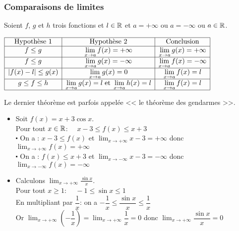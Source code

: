  \subsubsection*{Comparaisons de limites}
\begin{theorem}
Soient $f $, $g$ et $h$ trois fonctions et $ l\in\mathbb{R}$ et  $ a= +\infty $ ou $ a=-\infty $ ou $ a\in\mathbb{R} $.



$\begin{array}{|c|c|c|}
\hline
\text{Hypothèse 1}  & \text{Hypothèse 2} & \text{Conclusion}\\
\hline
 f\leq g   &  \displaystyle \lim_{x \to a}f(x)=+\infty  & \displaystyle \lim_{x \to a}g(x)=+\infty  \\
 \hline
  f\leq g   & \displaystyle \lim_{x \to a}g(x)=-\infty  &  \displaystyle \lim_{x \to a}f(x)=-\infty     \\
\hline
 \left\lvert f(x)-l  \right\rvert\leq g(x)  & \displaystyle \lim_{x \to a}g(x)=0 &  \displaystyle \lim_{x \to a}f(x)=l   \\
\hline
 g \leq f \leq h  &  \displaystyle \lim_{x \to a}g(x)=l \;\text{et} \; \displaystyle \lim_{x \to a}h(x)=l  &  \displaystyle \lim_{x \to a}f(x)=l     \\
\hline
\end{array}$
\end{theorem}

\begin{remark}
Le dernier théorème est parfois appelée << le théorème des gendarmes >>.
 \end{remark}

\begin{example}
\begin{itemize}
\item  Soit $ f(x)= x+ 3\cos x $.\\
Pour tout $x\in\mathbb{R}$:  $\quad x-3\leq f(x)\leq x+3 $ \\
$ \centerdot $  On a : $ x-3\leq f(x)$ et $\displaystyle \lim_{x \to +\infty}x-3=+\infty  $ donc $ \displaystyle \lim_{x \to +\infty}f(x)=+\infty $\\
$ \centerdot $ On a :  $  f(x)\leq x+3$ et $\displaystyle \lim_{x \to -\infty}x-3=-\infty  $ donc $ \displaystyle \lim_{x \to -\infty}f(x)=-\infty $ \\

\item  Calculons $\displaystyle\lim_{x \to +\infty}\frac{\sin x}{x} $.\\

Pour tout $ x\geq 1 $: $\quad  -1\leq\sin x \leq 1 $ \\
En multipliant par $ \dfrac{1}{x} $: on a $ -\dfrac{1}{x}\leq \dfrac{\sin x}{x} \leq\dfrac{1}{x} $\\
Or $\displaystyle\lim_{x \to +\infty}(-\dfrac{1}{x})= \displaystyle\lim_{x \to +\infty}\dfrac{1}{x}=0$ donc $\displaystyle\lim_{x \to +\infty}\dfrac{\sin x}{x}=0 $
\end{itemize}

\end{example}

